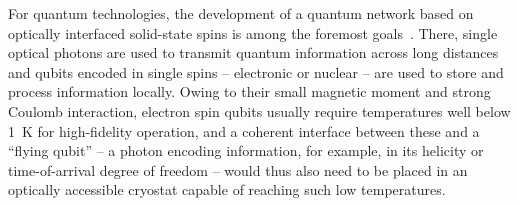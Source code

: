 For quantum technologies, the development of a quantum network based on optically interfaced solid-state spins is among the foremost goals~\cite{Awschalom2018,Azuma2023,Heindel2023,Zajac2025}.
There, single optical photons are used to transmit quantum information across long distances and qubits encoded in single spins -- electronic or nuclear -- are used to store and process information locally.
Owing to their small magnetic moment and strong Coulomb interaction, electron spin qubits usually require temperatures well below \qty{1}{\kelvin} for high-fidelity operation, and a coherent interface between these and a \enquote{flying qubit} -- a photon encoding information, for example, in its helicity or time-of-arrival degree of freedom -- would thus also need to be placed in an optically accessible cryostat capable of reaching such low temperatures.

